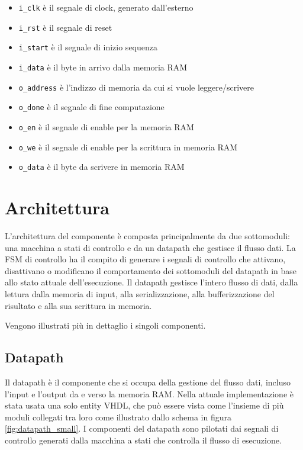 \documentclass[12pt, a4paper]{article}
\begin{document}
\begin{itemize}
    \item \texttt{i\_clk} è il segnale di clock, generato dall'esterno
    \item \texttt{i\_rst} è il segnale di reset
    \item \texttt{i\_start} è il segnale di inizio sequenza
    \item \texttt{i\_data} è il byte in arrivo dalla memoria RAM
    \item \texttt{o\_address} è l'indizzo di memoria da cui si vuole leggere/scrivere
    \item \texttt{o\_done} è il segnale di fine computazione
    \item \texttt{o\_en} è il segnale di enable per la memoria RAM
    \item \texttt{o\_we} è il segnale di enable per la scrittura in memoria RAM
    \item \texttt{o\_data} è il byte da scrivere in memoria RAM
\end{itemize}

\pagebreak

\section{Architettura}

L'architettura del componente è composta principalmente da due sottomoduli: una macchina a stati di controllo
e da un datapath che gestisce il flusso dati.
La FSM di controllo ha il compito di generare i segnali di controllo che attivano, disattivano o modificano
il comportamento dei sottomoduli del datapath in base allo stato attuale dell'esecuzione.
Il datapath gestisce l'intero flusso di dati, dalla lettura dalla memoria di input, alla serializzazione, 
alla bufferizzazione del risultato e alla sua scrittura in memoria.

\noindent Vengono illustrati più in dettaglio i singoli componenti.

\subsection{Datapath}

Il datapath è il componente che si occupa della gestione del flusso dati, incluso l'input e l'output
da e verso la memoria RAM.
Nella attuale implementazione è stata usata una solo entity VHDL, che può essere vista come l'insieme
di più moduli collegati tra loro come illustrato dallo schema in figura \ref{fig:datapath_small}.
I componenti del datapath sono pilotati dai segnali di controllo generati dalla macchina a stati che
controlla il flusso di esecuzione.
\end{document}
